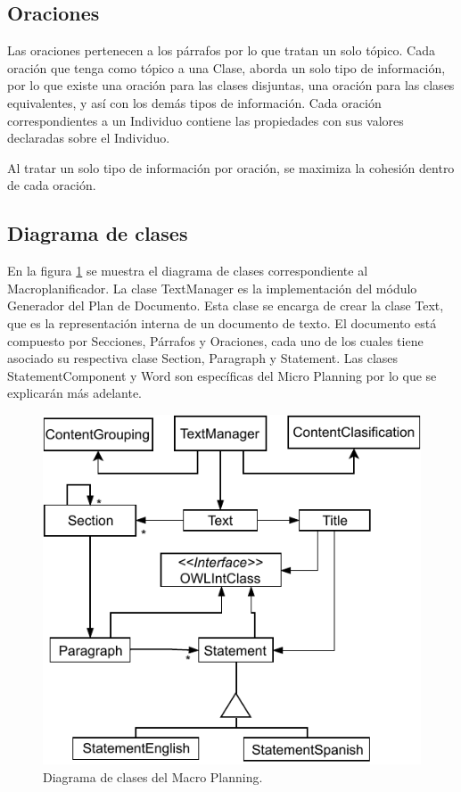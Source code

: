 \subsection{Oraciones}
Las oraciones pertenecen a los párrafos por lo que tratan un solo tópico. Cada oración que tenga como tópico a una Clase,  aborda un solo tipo de información, por lo que existe una oración para las clases disjuntas, una oración para las clases equivalentes, y así con los demás tipos de información. Cada oración correspondientes a un Individuo contiene las propiedades con sus valores declaradas sobre el Individuo.

Al tratar un solo tipo de información por oración, se maximiza la cohesión dentro de cada oración.


\subsection{Diagrama de clases}
En la figura \ref{fig:diagrama_clases_macroplanificador} se muestra el diagrama de clases correspondiente al Macroplanificador. La clase TextManager es la implementación del módulo Generador del Plan de Documento. Esta clase se encarga de crear la clase Text, que es la representación interna de un documento de texto. El documento está compuesto por Secciones, Párrafos y Oraciones, cada uno de los cuales tiene asociado su respectiva clase Section, Paragraph y Statement. Las clases StatementComponent y Word son específicas del Micro Planning por lo que se explicarán más adelante.

\begin{figure}
    \centering
    \includegraphics{img/generacion_documento/diagrama_clases_macroplanificador.pdf}
    \caption{Diagrama de clases del Macro Planning.}
    \label{fig:diagrama_clases_macroplanificador}
\end{figure}

